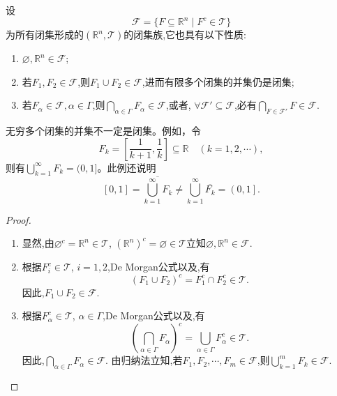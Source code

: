 \documentclass[../../main.tex]{subfiles}%
\begin{document}
\begin{theorem}[闭集的基本性质]\label{theorem:引理1.4.1-实变函数}
设
\[
\mathscr{F}=\{F\subseteq\mathbb{R}^n\mid F^c\in\mathscr{T}\}
\]
为所有闭集形成的$(\mathbb{R}^n,\mathscr{T})$的闭集族,它也具有以下性质:
\begin{enumerate}[(1)]
\item\label{theorem:引理1.4.1-实变函数-1} $\varnothing,\mathbb{R}^n\in\mathscr{F}$;

\item\label{theorem:引理1.4.1-实变函数-2} 若$F_1,F_2\in\mathscr{F}$,则$F_1\cup F_2\in\mathscr{F}$,进而有限多个闭集的并集仍是闭集;

\item\label{theorem:引理1.4.1-实变函数-3} 若$F_\alpha\in\mathscr{F},\alpha\in\Gamma$,则$\bigcap_{\alpha\in\Gamma}F_\alpha\in\mathscr{F}$,或者, $\forall\mathscr{F}'\subseteq\mathscr{F}$,必有$\bigcap_{F\in\mathscr{F}'}F\in\mathscr{F}$.
\end{enumerate}
\end{theorem}
\begin{remark}
无穷多个闭集的并集不一定是闭集。例如，令
\[F_k=\left[\frac{1}{k + 1},\frac{1}{k}\right]\subseteq\mathbb{R}\quad(k = 1,2,\cdots),\]
则有\(\bigcup_{k = 1}^{\infty}F_k=(0,1]\)。此例还说明
\[\left[ 0,1 \right] =\overline{\bigcup_{k=1}^{\infty}{F_k}}\ne \bigcup_{k=1}^{\infty}{\overline{F_k}}=\left( 0,1 \right] .\]
\end{remark}
\begin{proof}
\begin{enumerate}[(1)]
\item 显然,由$\varnothing^c=\mathbb{R}^n\in\mathscr{T}$, $(\mathbb{R}^n)^c=\varnothing\in\mathscr{T}$立知$\varnothing,\mathbb{R}^n\in\mathscr{F}$.

\item 根据$F_i^c\in\mathscr{T}$, $i=1,2$,De Morgan公式以及,有
\[
(F_1\cup F_2)^c=F_1^c\cap F_2^c\in\mathscr{T}.
\]
因此,$F_1\cup F_2\in\mathscr{F}$.

\item 根据$F_\alpha^c\in\mathscr{T}$, $\alpha\in\Gamma$,De Morgan公式以及,有
\[
\left(\bigcap_{\alpha\in\Gamma}F_\alpha\right)^c=\bigcup_{\alpha\in\Gamma}F_\alpha^c\in\mathscr{T}.
\]
因此,$\bigcap_{\alpha\in\Gamma}F_\alpha\in\mathscr{F}$.
由归纳法立知,若$F_1,F_2,\cdots,F_m\in\mathscr{F}$,则$\bigcup_{k=1}^m F_k\in\mathscr{F}$.
\end{enumerate}

\end{proof}
\end{document}
